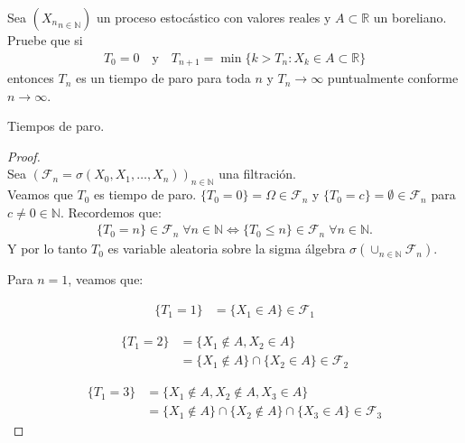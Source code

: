 \begin{problema}
	Sea $\left({X_n}_{n\in\mathbb{N}}\right)$ un proceso estocástico con valores reales y $A\subset \mathbb{R}$ un boreliano. 
	Pruebe que si
	\begin{align}
		T_0=0\quad\text{y}\quad T_{n+1}=\min\{k>T_n: X_k\in A \subset \mathbb{R}\}
	\end{align}
	entonces $T_n$ es un tiempo de paro para toda $n$ y $T_n\to \infty$ puntualmente conforme $n\to\infty$. 

	\begin{categoria} 
		Tiempos de paro.
	\end{categoria}
\end{problema}
		
\begin{proof}
\\

	Sea $(\mathscr{F}_n = \sigma(  X_0, X_1, \dots, X_n ))_{ n \in \mathbb{N}}$ una filtración.
\\

	Veamos que $T_0$ es tiempo de paro. $\{T_0 = 0\} = \Omega \in \mathscr{F}_n$ y 
	$\{T_0 = c\} = \emptyset \in \mathscr{F}_n$ para $c \not= 0 \in \mathbb{N}$. Recordemos que:		
	\begin{align}\label{problema_1_1:equivalencia_varable_aleatoria}
		\{T_0 = n\} \in \mathscr{F}_n \; \forall n \in \mathbb{N} \iff 
		\{T_0 \leq n\} \in \mathscr{F}_n \; \forall n \in \mathbb{N}.
	\end{align}
	Y por lo tanto $T_0$ es variable aleatoria sobre la sigma álgebra $\sigma(\cup_{n \in \mathbb{N}} 
	\mathscr{F}_n)$.

	Para $n=1$, veamos que:
 
	\begin{align}
			\{T_1 = 1\}     &= \{ X_1 \in A \}	\in \mathscr{F}_1 
	\end{align}
	
	\begin{align}
			\{T_1 = 2\} 	&= 	\{ X_1 \not\in A, X_2 \in A \} \\
							&= 	\{ X_1 \not\in A \} \cap \{X_2 \in A \} \in \mathscr{F}_2	
	\end{align}
	
	\begin{align}
			\{T_1 = 3\} 	&=	\{ X_1 \not\in A, X_2 \not\in A,  X_3 \in A \} \\ 
							&= 	\{ X_1 \not\in A \} \cap \{ X_2 \not\in A \} \cap \{X_3 \in A \} \in \mathscr{F}_3
	\end{align}
	

\end{proof}
